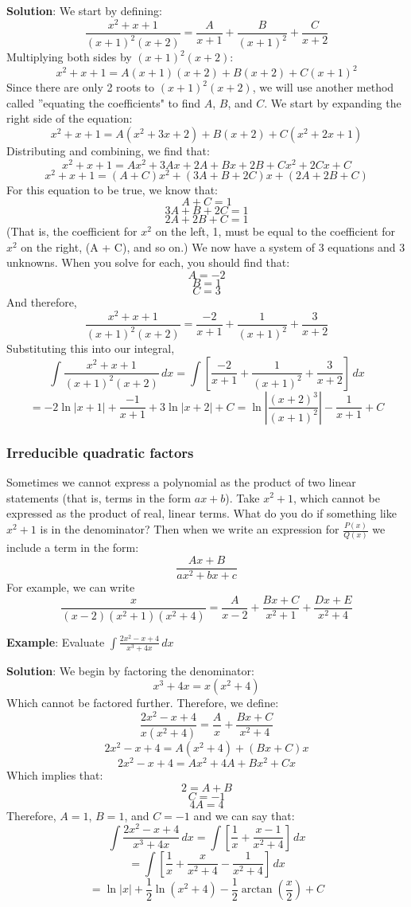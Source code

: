 \textbf{Solution}: We start by defining:
$$\frac{x^2 + x + 1}{(x + 1)^2 (x + 2)} = \frac{A}{x + 1} + \frac{B}{(x + 1)^
2} + \frac{C}{x + 2}$$
Multiplying both sides by $(x + 1)^2 (x + 2)$:
$$x^2 + x + 1 = A(x + 1)(x + 2) + B(x + 2) + C(x + 1)^2$$
Since there are only 2 roots to $(x + 1)^2 (x + 2)$, we will use another 
method called ''equating the coefficients" to find $A$, $B$, and $C$. We start 
by expanding the right side of the equation:
$$x^2 + x + 1 = A(x^2 + 3x + 2) + B(x + 2) + C(x^2 + 2x + 1)$$
Distributing and combining, we find that:
$$x^2 + x + 1 = Ax^2 + 3Ax + 2A + Bx + 2B + Cx^2 + 2Cx + C$$
$$x^2 + x + 1 = (A + C)x^2 + (3A + B + 2C)x + (2A + 2B + C)$$
For this equation to be true, we know that:
$$A + C = 1$$
$$3A + B + 2C = 1$$
$$2A + 2B + C = 1$$
(That is, the coefficient for $x^2$ on the left, 1, must be equal to the 
coefficient for $x^2$ on the right, (A + C), and so on.) We now have a system 
of 3 equations and 3 unknowns. When you solve for each, you should find that:
$$A = -2$$
$$B = 1$$
$$C = 3$$
And therefore, 
$$\frac{x^2 + x + 1}{(x + 1)^2 (x + 2)} = \frac{-2}{x + 1} + \frac{1}{(x + 1)^
2} + \frac{3}{x + 2}$$
Substituting this into our integral, 
$$\int \frac{x^2 + x + 1}{(x + 1)^2 (x + 2)}\,dx = \int \left[ \frac{-2}{x + 1} 
+ \frac{1}{(x + 1)^2} + \frac{3}{x + 2} \right]\,dx$$
$$ = -2\ln{|x + 1|} + \frac{-1}{x + 1} + 3\ln{|x + 2|} + C = \ln{ \left| \frac{
(x + 2)^3}{(x + 1)^2} \right| } - \frac{1}{x + 1} + C$$

\subsubsection{Irreducible quadratic factors}
Sometimes we cannot express a polynomial as the product of two linear 
statements (that is, terms in the form $ax + b$). Take $x^2 + 1$, which 
cannot be expressed as the product of real, linear terms. What do you do 
if something like $x^2 + 1$ is in the denominator? Then when we write an 
expression for $\frac{P(x)}{Q(x)}$ we include a term in the form:
$$\frac{Ax + B}{ax^2 + bx + c}$$
For example, we can write
$$\frac{x}{(x - 2)(x^2 + 1)(x^2 + 4)} = \frac{A}{x - 2} + \frac{Bx + C}{x^2 + 1} 
+ \frac{Dx + E}{x^2 + 4}$$

\textbf{Example}: Evaluate $\int \frac{2x^2 - x + 4}{x^3 + 4x}\,dx$

\textbf{Solution}: We begin by factoring the denominator:
$$x^3 + 4x = x(x^2 + 4)$$
Which cannot be factored further. Therefore, we define:
$$\frac{2x^2 - x + 4}{x(x^2 + 4)} = \frac{A}{x} + \frac{Bx + C}{x^2 + 4}$$
$$2x^2 - x + 4 = A(x^2 + 4) + (Bx + C)x$$
$$2x^2 - x + 4 = Ax^2 + 4A + Bx^2 + Cx$$
Which implies that:
$$2 = A + B$$
$$C = -1$$
$$4A = 4$$
Therefore, $A = 1$, $B = 1$, and $C = -1$ and we can say that:
$$\int \frac{2x^2 - x + 4}{x^3 + 4x}\,dx = \int	\left[ \frac{1}{x} + \frac{x - 
1}{x^2 + 4} \right] \,dx$$
$$= \int \left[ \frac{1}{x} + \frac{x}{x^2 + 4} - \frac{1}{x^2 + 4} \right]\,
dx$$
$$= \ln{|x|} + \frac{1}{2}\ln{(x^2 + 4)} - \frac{1}{2}\arctan{\left( \frac{x}{2} 
\right) } + C$$

